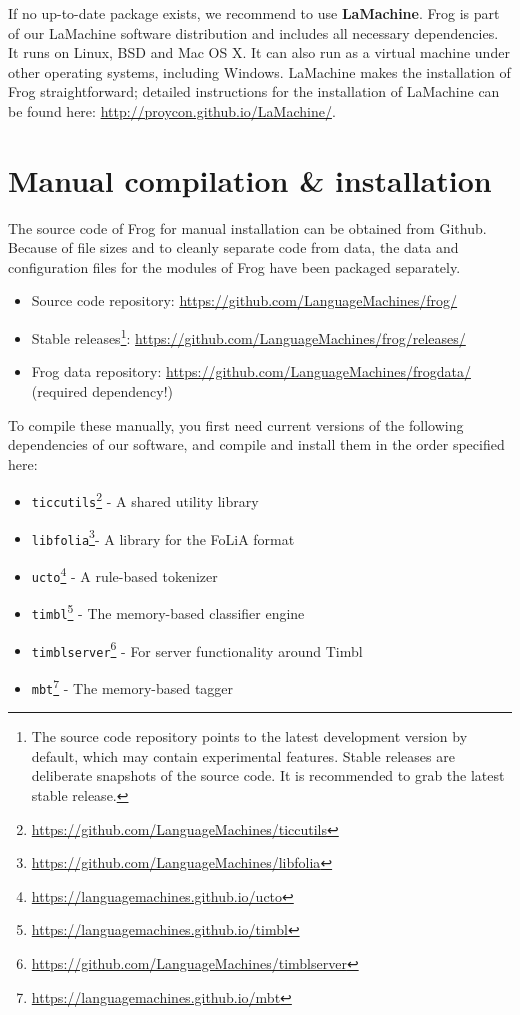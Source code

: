 \documentclass{book}
\begin{document}
If no up-to-date package exists, we recommend to use \textbf{LaMachine}. Frog is
part of our LaMachine software distribution and includes all
necessary dependencies. It runs on Linux, BSD and Mac OS X. It can also run as
a virtual machine under other operating systems, including Windows.  LaMachine
makes the installation of Frog straightforward; detailed instructions for
the installation of LaMachine can be found here: \url{http://proycon.github.io/LaMachine/}.

\section{Manual compilation \& installation}

The source code of Frog for manual installation can be obtained from Github.
Because of file sizes and to cleanly separate code from data, the data and
configuration files for the modules of Frog have been packaged separately.

\begin{itemize}
    \item   Source code repository: \url{https://github.com/LanguageMachines/frog/}
    \item   Stable releases\footnote{The source code repository points to the latest
            development version by default, which may contain experimental
            features. Stable releases are deliberate snapshots of the source
            code. It is recommended to grab the latest stable release.}:
            \url{https://github.com/LanguageMachines/frog/releases/}
    \item   Frog data repository: \url{https://github.com/LanguageMachines/frogdata/} (required dependency!)
\end{itemize}

To compile these manually, you first need current versions of the following
dependencies of our software, and compile and install them in the order
specified here:

\begin{itemize}
    \item \texttt{ticcutils}\footnote{\url{https://github.com/LanguageMachines/ticcutils}} - A shared utility library
    \item \texttt{libfolia}\footnote{\url{https://github.com/LanguageMachines/libfolia}}- A library for the FoLiA format
    \item \texttt{ucto}\footnote{\url{https://languagemachines.github.io/ucto}} - A rule-based tokenizer
    \item \texttt{timbl}\footnote{\url{https://languagemachines.github.io/timbl}} - The memory-based classifier engine
    \item \texttt{timblserver}\footnote{\url{https://github.com/LanguageMachines/timblserver}} - For server functionality around Timbl
    \item \texttt{mbt}\footnote{\url{https://languagemachines.github.io/mbt}}  - The memory-based tagger
\end{itemize}
\end{document}

